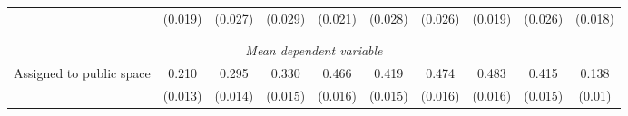 \begin{tabular}{l*{9}{c}}
                    &     (0.019)         &     (0.027)         &     (0.029)         &     (0.021)         &     (0.028)         &     (0.026)         &     (0.019)         &     (0.026)         &     (0.018)         \\
\\[-1.8ex] \hline \\[-1.8ex]  
\multicolumn{10}{c}{\textit{Mean dependent variable}} \\ Assigned to public space&       0.210         &       0.295         &       0.330         &       0.466         &       0.419         &       0.474         &       0.483         &       0.415         &       0.138         \\
\,                  &     (0.013)         &     (0.014)         &     (0.015)         &     (0.016)         &     (0.015)         &     (0.016)         &     (0.016)         &     (0.015)         &      (0.01)         \\


\end{tabular}
